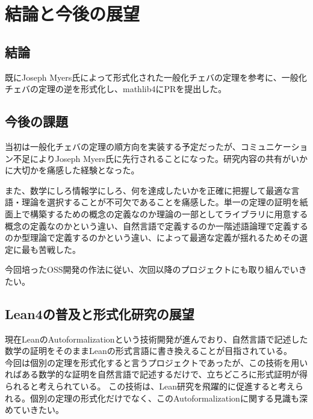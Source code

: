 \documentclass[a4paper,12pt]{bxjsbook}
\newlength{\customindent}
\newenvironment{body}{
  \par
  \begingroup
  \setlength{\leftskip}{\customindent}
  \setlength{\rightskip}{0pt}
  \setlength{\parindent}{1em}
  \setlength{\displayindent}{\customindent}
  \setlength{\displaywidth}{\dimexpr\linewidth-\customindent\relax}
}{
  \par
  \endgroup
}
\theoremstyle{theorem}
\begin{document}
    \chapter{結論と今後の展望}

    \section{結論}
    \begin{body}
        \indent 既にJoseph Myers氏によって形式化された一般化チェバの定理を参考に、一般化チェバの定理の逆を形式化し、mathlib4にPRを提出した。
    \end{body}

    \section{今後の課題}
    \begin{body}
        \indent 当初は一般化チェバの定理の順方向を実装する予定だったが、コミュニケーション不足によりJoseph Myers氏に先行されることになった。研究内容の共有がいかに大切かを痛感した経験となった。

        \indent また、数学にしろ情報学にしろ、何を達成したいかを正確に把握して最適な言語・理論を選択することが不可欠であることを痛感した。単一の定理の証明を紙面上で構築するための概念の定義なのか理論の一部としてライブラリに用意する概念の定義なのかという違い、自然言語で定義するのか一階述語論理で定義するのか型理論で定義するのかという違い、によって最適な定義が揺れるためその選定に最も苦戦した。
        
        \indent 今回培ったOSS開発の作法に従い、次回以降のプロジェクトにも取り組んでいきたい。
    \end{body}

    \section{Lean4の普及と形式化研究の展望}
    \begin{body}
        \indent 現在LeanのAutoformalizationという技術開発が進んでおり、自然言語で記述した数学の証明をそのままLeanの形式言語に書き換えることが目指されている。\\
        今回は個別の定理を形式化すると言うプロジェクトであったが、この技術を用いればある数学的な証明を自然言語で記述するだけで、立ちどころに形式証明が得られると考えられている。
        この技術は、Lean研究を飛躍的に促進すると考えられる。個別の定理の形式化だけでなく、このAutoformalizationに関する見識も深めていきたい。
    \end{body}
\end{document}
